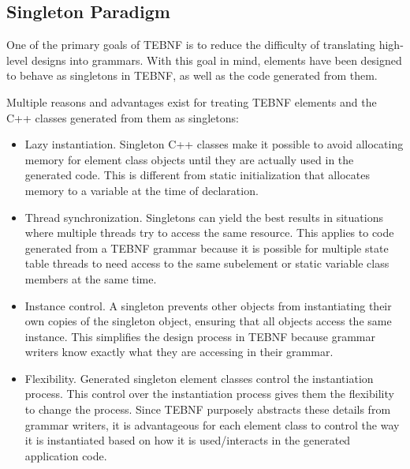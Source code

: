 \subsection{Singleton Paradigm}
One of the primary goals of TEBNF is to reduce the difficulty of translating high-level designs into grammars.  With this goal in mind, elements have been designed to behave as singletons in TEBNF, as well as the code generated from them.

\indent
Multiple reasons and advantages exist for treating TEBNF elements and the C++ classes generated from them as singletons:
\begin{itemize}
  \item Lazy instantiation.  Singleton C++ classes make it possible to avoid allocating memory for element class objects until they are actually used in the generated code.  This is different from static initialization that allocates memory to a variable at the time of declaration.
  \item Thread synchronization.   Singletons can yield the best results in situations where multiple threads try to access the same resource.  This applies to code generated from a TEBNF grammar because it is possible for multiple state table threads to need access to the same subelement or static variable class members at the same time.
  \item Instance control.  A singleton prevents other objects from instantiating their own copies of the singleton object, ensuring that all objects access the same instance.  This simplifies the design process in TEBNF because grammar writers know exactly what they are accessing in their grammar.
  \item Flexibility.  Generated singleton element classes control the instantiation process.  This control over the instantiation process gives them the flexibility to change the process.  Since TEBNF purposely abstracts these details from grammar writers, it is advantageous for each element class to control the way it is instantiated based on how it is used/interacts in the generated application code.
\end{itemize}


